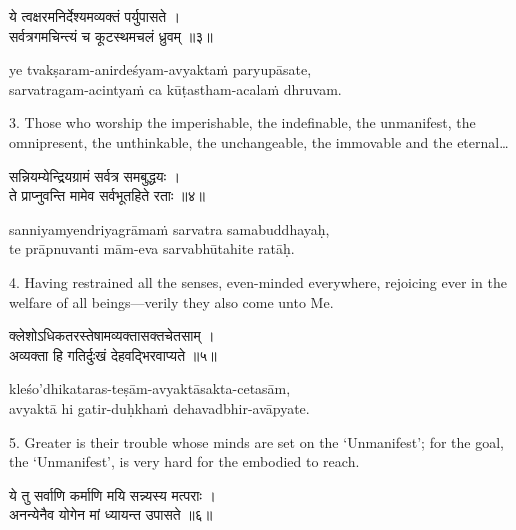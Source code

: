 \begin{gitaverse}
ये त्वक्षरमनिर्देश्यमव्यक्तं पर्युपासते । \\
सर्वत्रगमचिन्त्यं च कूटस्थमचलं ध्रुवम् ॥३॥
\end{gitaverse}

\begin{transliteration}
ye tvakṣaram-anirdeśyam-avyaktaṁ paryupāsate, \\
sarvatragam-acintyaṁ ca kūṭastham-acalaṁ dhruvam.
\end{transliteration}

3. Those who worship the imperishable, the indefinable, the unmanifest, the
omnipresent, the unthinkable, the unchangeable, the immovable and the
eternal\ldots

\begin{gitaverse}
सन्नियम्येन्द्रियग्रामं सर्वत्र समबुद्धयः । \\
ते प्राप्नुवन्ति मामेव सर्वभूतहिते रताः ॥४॥
\end{gitaverse}

\begin{transliteration}
sanniyamyendriyagrāmaṁ sarvatra samabuddhayaḥ, \\
te prāpnuvanti mām-eva sarvabhūtahite ratāḥ.
\end{transliteration}

4. Having restrained all the senses, even-minded everywhere, rejoicing ever in
the welfare of all beings---verily they also come unto Me.

\begin{gitaverse}
क्लेशोऽधिकतरस्तेषामव्यक्तासक्तचेतसाम् । \\
अव्यक्ता हि गतिर्दुःखं देहवद्भिरवाप्यते ॥५॥
\end{gitaverse}

\begin{transliteration}
kleśo'dhikataras-teṣām-avyaktāsakta-cetasām, \\
avyaktā hi gatir-duḥkhaṁ dehavadbhir-avāpyate.
\end{transliteration}

5. Greater is their trouble whose minds are set on the `Unmanifest'; for the
goal, the `Unmanifest', is very hard for the embodied to reach.

\begin{gitaverse}
ये तु सर्वाणि कर्माणि मयि सन्न्यस्य मत्पराः । \\
अनन्येनैव योगेन मां ध्यायन्त उपासते ॥६॥
\end{gitaverse}

